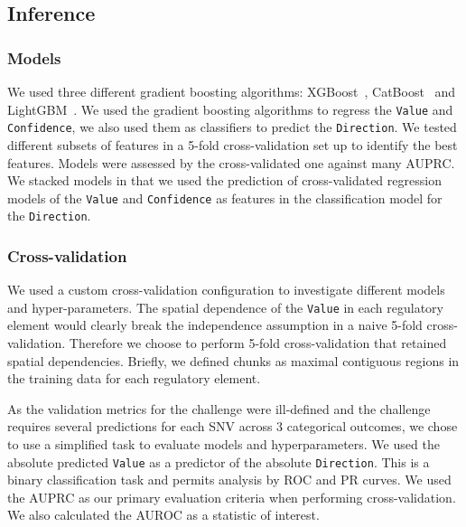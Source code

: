 \documentclass{article}
\begin{document}
\subsection*{Inference}


\subsubsection*{Models}

We used three different gradient boosting algorithms:
XGBoost~\cite{ChenXGBoostScalableTree2016},
CatBoost~\cite{ProkhorenkovaCatBoostunbiasedboosting2017} and
LightGBM~\cite{KeLightGBMHighlyEfficient2017}. We used the gradient boosting
algorithms to regress the \texttt{Value} and \texttt{Confidence}, we also used
them as classifiers to predict the \texttt{Direction}. We tested different
subsets of features in a 5-fold cross-validation set up to identify the best
features.  Models were assessed by the cross-validated one against many
\ac{AUPRC}. We stacked models in that we used
the prediction of cross-validated regression models of the \texttt{Value} and
\texttt{Confidence} as features in the classification model for the
\texttt{Direction}.


\subsubsection*{Cross-validation}

We used a custom cross-validation configuration to investigate different models
and hyper-parameters.  The spatial dependence of the \texttt{Value} in each
regulatory element would clearly break the independence assumption in a naive
5-fold cross-validation.  Therefore we choose to perform 5-fold
cross-validation that retained spatial dependencies. Briefly, we defined chunks
as maximal contiguous regions in the training data for each regulatory element.

As the validation metrics for the challenge were ill-defined and the challenge
requires several predictions for each \ac{SNV} across 3 categorical outcomes, we
chose to use a simplified task to evaluate models and hyperparameters. We used
the absolute predicted \texttt{Value} as a predictor of the absolute
\texttt{Direction}.  This is a binary classification task and permits analysis
by \ac{ROC} and \ac{PR} curves. We used the \ac{AUPRC} as our primary
evaluation criteria when performing cross-validation. We also calculated the
\ac{AUROC} as a statistic of interest.

\end{document}
